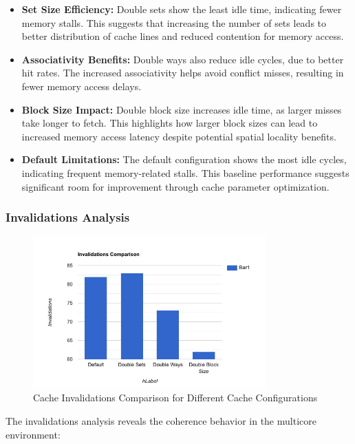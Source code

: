 \documentclass[10pt]{article}
\begin{document}
\begin{itemize}
    \item \textbf{Set Size Efficiency:} Double sets show the least idle time, indicating fewer memory stalls. This suggests that increasing the number of sets leads to better distribution of cache lines and reduced contention for memory access.
    
    \item \textbf{Associativity Benefits:} Double ways also reduce idle cycles, due to better hit rates. The increased associativity helps avoid conflict misses, resulting in fewer memory access delays.
    
    \item \textbf{Block Size Impact:} Double block size increases idle time, as larger misses take longer to fetch. This highlights how larger block sizes can lead to increased memory access latency despite potential spatial locality benefits.
    
    \item \textbf{Default Limitations:} The default configuration shows the most idle cycles, indicating frequent memory-related stalls. This baseline performance suggests significant room for improvement through cache parameter optimization.
\end{itemize}

\subsubsection{Invalidations Analysis}
\begin{figure}[H]
    \centering
    \includegraphics[width=0.8\textwidth]{./images/invalidations.png}
    \caption{Cache Invalidations Comparison for Different Cache Configurations}
\end{figure}

The invalidations analysis reveals the coherence behavior in the multicore environment:
\end{document}

